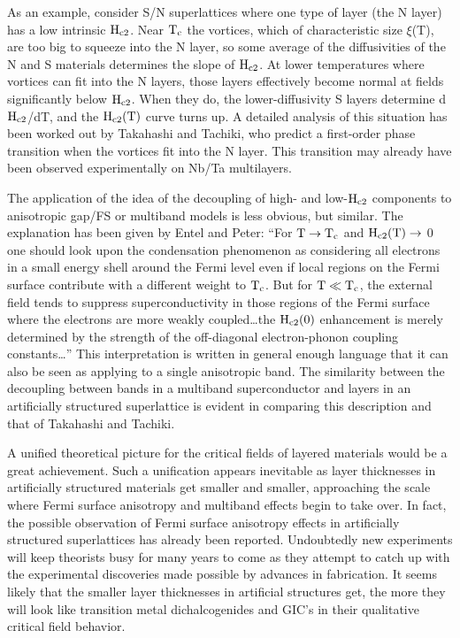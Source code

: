         As an example, consider  S/N  superlattices where one type of layer
(the  N layer)  has a   low intrinsic $\rm  H_{c2}$.   Near  $\rm T_c$  the
vortices, which  of characteristic size  $\xi$(T),  are too  big to squeeze
into the  N layer,  so some average  of the diffusivities of the   N  and S
materials determines the slope of  $\rm  H_{c2}$.   At  lower  temperatures
where vortices can fit into  the N layers, those  layers effectively become
normal at  fields  significantly  below  $\rm H_{c2}$.  When they  do,  the
lower-diffusivity  S   layers determine   d$\rm  H_{c2}$/dT, and  the  $\rm
H_{c2}(T)$ curve turns up.  A detailed  analysis of this situation has been
worked   out by   Takahashi and Tachiki, who   predict  a first-order phase
transition when the vortices fit into  the N layer.\cite{takahashi86c} This
transition  may already    have  been   observed  experimentally on   Nb/Ta
multilayers.\cite{broussard87b,kanoda86}

        The application of the idea of the decoupling of high- and low-$\rm
H_{c2}$  components  to  anisotropic  gap/FS or  multiband  models  is less
obvious, but similar.  The explanation  has  been given by Entel and Peter:
``For $\rm T \rightarrow T_c$ and $\rm H_{c2}(T) \rightarrow$  0 one should
look upon the condensation  phenomenon  as considering all  electrons  in a
small energy  shell  around the Fermi level   even if local regions on  the
Fermi surface  contribute  with a different  weight to  $\rm T_c$.  But for
$\rm T \ll T_c$, the external field tends to  suppress superconductivity in
those regions of  the Fermi surface where  the  electrons are  more  weakly
coupled\ldots  the $\rm H_{c2}(0)$  enhancement is merely determined by the
strength  of       the    off-diagonal      electron-phonon        coupling
constants\ldots''\cite{entel76}  This interpretation  is written in general
enough language that  it   can also  be  seen as   applying  to  a   single
anisotropic band.  The similarity between the decoupling between bands in a
multiband   superconductor  and   layers    in  an  artificially structured
superlattice is evident in comparing this description and that of Takahashi
and Tachiki.\cite{takahashi86c}

        A  unified theoretical picture for the  critical fields of  layered
materials would  be   a   great achievement.   Such  a unification  appears
inevitable  as layer  thicknesses in artificially structured materials  get
smaller and smaller, approaching the  scale where Fermi  surface anisotropy
and  multiband   effects begin  to  take  over.   In    fact,  the possible
observation of Fermi surface anisotropy effects in  artificially structured
superlattices has  already been reported.\cite{broussard88} Undoubtedly new
experiments will keep theorists busy for many years to come as they attempt
to catch up with the experimental discoveries made possible by  advances in
fabrication.\cite{ruggiero85}  It   seems likely that    the  smaller layer
thicknesses in artificial structures  get,  the more   they will look  like
transition metal dichalcogenides  and GIC's  in their  qualitative critical
field behavior.

